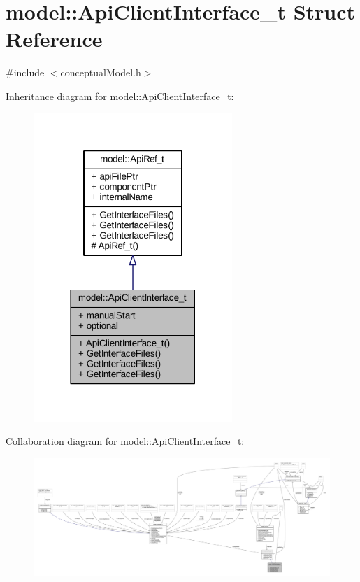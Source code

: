 \hypertarget{structmodel_1_1_api_client_interface__t}{}\section{model\+:\+:Api\+Client\+Interface\+\_\+t Struct Reference}
\label{structmodel_1_1_api_client_interface__t}


{\ttfamily \#include $<$conceptual\+Model.\+h$>$}



Inheritance diagram for model\+:\+:Api\+Client\+Interface\+\_\+t\+:
\nopagebreak
\begin{figure}[H]
\begin{center}
\leavevmode
\includegraphics[width=213pt]{structmodel_1_1_api_client_interface__t__inherit__graph}
\end{center}
\end{figure}


Collaboration diagram for model\+:\+:Api\+Client\+Interface\+\_\+t\+:
\nopagebreak
\begin{figure}[H]
\begin{center}
\leavevmode
\includegraphics[width=350pt]{structmodel_1_1_api_client_interface__t__coll__graph}
\end{center}
\end{figure}
